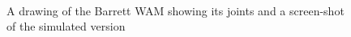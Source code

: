 \documentclass[11pt, article, colorback]{article}
\begin{document}
\begin{figure}
{\centering
\mbox{\quad
{}}
\caption{A drawing of the Barrett WAM showing its joints and a screen-shot of the simulated version} \label{pic:WAM}}
\label{pic:wam}
\end{figure}
\end{document}
